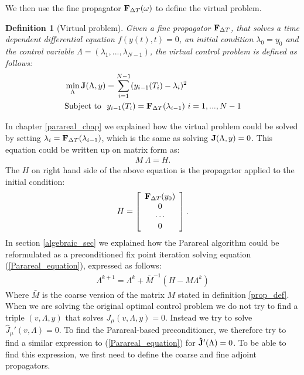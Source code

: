 \documentclass[11pt,a4paper]{article}
\newtheorem{definition}{Definition}
\begin{document}
We then use the fine propagator $\bold F_{\Delta T}(\omega)$ to define the virtual problem.
\begin{definition}[Virtual problem]
Given a fine propagator $\bold F_{\Delta T}$, that solves a time dependent differential equation $f(y(t),t)=0$, an initial condition $\lambda_0=y_0$ and the control variable $\Lambda=(\lambda_1,...,\lambda_ {N-1})$, the virtual control problem is defined as follows:
\begin{align}
&\min_{\Lambda}\bold{J}(\Lambda,y) = \sum_{i=1}^{N-1} (y_{i-1}(T_{i})-\lambda_{i})^2 \label{virtual_func} \\
&\textrm{Subject to } \ y_{i-1}(T_{i}) = \bold F_{\Delta T}(\lambda_{i-1}) \ i=1,...,N-1 \label{virtual}
\end{align}
\end{definition}
In chapter \ref{parareal_chap} we explained how the virtual problem could be solved by setting $\lambda_i= \bold F_{\Delta T}(\lambda_{i-1})$, which is the same as solving $\bold J(\Lambda,y)=0$. This equation could be written up on matrix form as:
\begin{align}
M \ \Lambda = H. \label{Parareal_equation}
\end{align}
The $H$ on right hand side of the above equation is the propagator applied to the initial condition:
\begin{align*}
H = \left[ \begin{array}{c}
   \bold F_{\Delta T}( y_0) \\
   0 \\
   \cdots \\
   0 \\
   \end{array}  \right].
\end{align*}
In section \ref{algebraic_sec} we explained how the Parareal algorithm could be reformulated as a preconditioned fix point iteration solving equation (\ref{Parareal_equation}), expressed as follows:
\begin{align}
\Lambda^{k+1} = \Lambda^k + \bar{M}^{-1}(H-M\Lambda^k)\label{par_mat_sys}
\end{align}
Where $\bar{M}$ is the coarse version of the matrix $M$ stated in definition \ref{prop_def}. When we are solving the original optimal control problem we do not try to find a triple $(v,\Lambda,y)$ that solves $J_{\mu}(v,\Lambda,y)=0$. Instead we try to solve $\hat J_{\mu}'(v,\Lambda)=0$. To find the Parareal-based preconditioner, we therefore try to find a similar expression to (\ref{Parareal_equation}) for $\bold{\hat{J}}'(\Lambda)=0$. To be able to find this expression, we first need to define the coarse and fine adjoint propagators.
\end{document}

